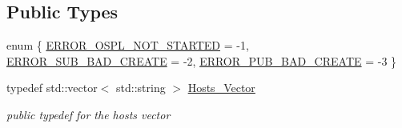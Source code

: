 \subsection*{Public Types}
\begin{DoxyCompactItemize}
\item 
enum \{ \hyperlink{classMadara_1_1Transport_1_1Splice__DDS__Transport_a25c6788d6c2ede61cb83830787ecde02ab527dde34f9f519547d343d239fbb800}{ERROR\_\-OSPL\_\-NOT\_\-STARTED} =  -\/1, 
\hyperlink{classMadara_1_1Transport_1_1Splice__DDS__Transport_a25c6788d6c2ede61cb83830787ecde02a33ef641bc528e63e10c24f41ca1a6f00}{ERROR\_\-SUB\_\-BAD\_\-CREATE} =  -\/2, 
\hyperlink{classMadara_1_1Transport_1_1Splice__DDS__Transport_a25c6788d6c2ede61cb83830787ecde02ac0b0287a44ae228e573b931ce086f387}{ERROR\_\-PUB\_\-BAD\_\-CREATE} =  -\/3
 \}
\item 
typedef std::vector$<$ std::string $>$ \hyperlink{classMadara_1_1Transport_1_1Base_a2957ae0c413e07b7e276ae69ef1c320a}{Hosts\_\-Vector}
\begin{DoxyCompactList}\small\item\em public typedef for the hosts vector \item\end{DoxyCompactList}\end{DoxyCompactItemize}
